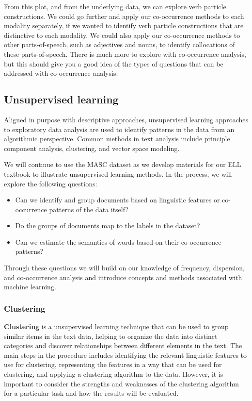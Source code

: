 \documentclass[
  letterpaper,
  DIV=11,
  numbers=noendperiod]{scrreport}
\providecommand{\tightlist}{%
  \setlength{\itemsep}{0pt}\setlength{\parskip}{0pt}}\usepackage{longtable,booktabs,array}
\theoremstyle{definition}
\theoremstyle{remark}
\begin{document}
From this plot, and from the underlying data, we can explore verb
particle constructions. We could go further and apply our co-occurrence
methods to each modality separately, if we wanted to identify verb
particle constructions that are distinctive to each modality. We could
also apply our co-occurrence methods to other parts-of-speech, such as
adjectives and nouns, to identify collocations of these parts-of-speech.
There is much more to explore with co-occurrence analysis, but this
should give you a good idea of the types of questions that can be
addressed with co-occurrence analysis.

\hypertarget{sec-eda-unsupervised}{%
\subsection{Unsupervised learning}\label{sec-eda-unsupervised}}

Aligned in purpose with descriptive approaches, unsupervised learning
approaches to exploratory data analysis are used to identify patterns in
the data from an algorithmic perspective. Common methods in text
analysis include principle component analysis, clustering, and vector
space modeling.

We will continue to use the MASC dataset as we develop materials for our
ELL textbook to illustrate unsupervised learning methods. In the
process, we will explore the following questions:

\begin{itemize}
\tightlist
\item
  Can we identify and group documents based on linguistic features or
  co-occurrence patterns of the data itself?
\item
  Do the groups of documents map to the labels in the dataset?
\item
  Can we estimate the semantics of words based on their co-occurrence
  patterns?
\end{itemize}

Through these questions we will build on our knowledge of frequency,
dispersion, and co-occurrence analysis and introduce concepts and
methods associated with machine learning.

\hypertarget{sec-eda-clustering}{%
\subsubsection{Clustering}\label{sec-eda-clustering}}

\textbf{Clustering} is a unsupervised learning technique that can be
used to group similar items in the text data, helping to organize the
data into distinct categories and discover relationships between
different elements in the text. The main steps in the procedure includes
identifying the relevant linguistic features to use for clustering,
representing the features in a way that can be used for clustering, and
applying a clustering algorithm to the data. However, it is important to
consider the strengths and weaknesses of the clustering algorithm for a
particular task and how the results will be evaluated.
\end{document}

